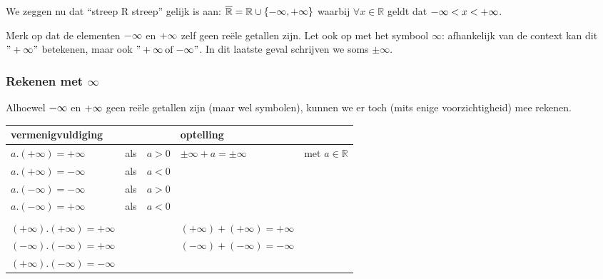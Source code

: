 \medskip{}


\noindent We zeggen nu dat ``streep R streep'' gelijk is aan: $\overline{\mathbb{R}}=\mathbb{R}\cup\{\text{\textminus\ensuremath{\infty}},+\text{\ensuremath{\infty}}\}$
waarbij $\forall x\in\mathbb{R}$ geldt dat $\text{\textminus\ensuremath{\infty}}<x<+\text{\ensuremath{\infty}}$.

\medskip{}


\noindent Merk op dat de elementen $\text{\textminus\ensuremath{\infty}}$
en $+\text{\ensuremath{\infty}}$ zelf geen re\"ele getallen zijn. Let
ook op met het symbool $\infty$: afhankelijk van de context kan dit
$"+\infty"$ betekenen, maar ook $"+\infty\:\mathrm{of}\:\text{\textminus\ensuremath{\infty}}"$.
In dit laatste geval schrijven we soms $\pm\infty$.


\subsubsection{Rekenen met $\infty$}

Alhoewel $\text{\textminus\ensuremath{\infty}}$ en $+\text{\ensuremath{\infty}}$
geen re\"ele getallen zijn (maar wel symbolen), kunnen we er toch (mits
enige voorzichtigheid) mee rekenen.

\medskip{}

\begin{table}
	\centering
	\begin{tabular}{|l|c|c||l|l|}
		\hline 
		\multicolumn{3}{|l||}{vermenigvuldiging} & \multicolumn{2}{l|}{optelling}\\
		\hline 
		\hline 
		$a.(+\infty)=+\infty$ & als & $a>0$ & $\pm\infty+a=\pm\infty$ & met $a\in\mathbb{R}$\\
		\hline 
		$a.(+\infty)=-\infty$ & als & $a<0$ &  & \\
		\hline 
		$a.(-\infty)=-\infty$ & als & $a>0$ &  & \\
		\hline 
		$a.(-\infty)=+\infty$ & als & $a<0$ &  & \\
		\hline 
		&  &  &  & \\
		\hline 
		$(+\infty).(+\infty)=+\infty$ &  &   & $(+\infty)+(+\infty)=+\infty$ & \\
		\hline 
		$(-\infty).(-\infty)=+\infty$ &  &   & $(-\infty)+(-\infty)=-\infty$ & \\
		\hline 
		$(+\infty).(-\infty)=-\infty$ &  &   &  & \\
		\hline 
	\end{tabular}
\end{table}

